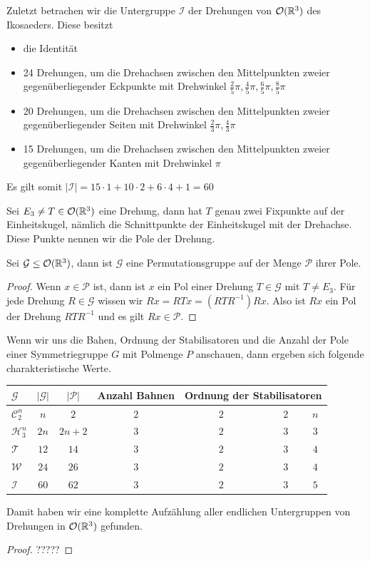 Zuletzt betrachen wir die Untergruppe $\mathcal{I}$ der Drehungen von ${\mathcal{O}(\mathbb{R}^3)}$ des Ikosaeders. Diese besitzt
\begin{itemize} 
  \item die Identität
  \item 24 Drehungen, um die Drehachsen zwischen den Mittelpunkten zweier gegenüberliegender Eckpunkte mit Drehwinkel $\frac{2}{5}\pi,\frac{4}{5}\pi,\frac{6}{5}\pi,\frac{8}{5}\pi$
  \item 20 Drehungen, um die Drehachsen zwischen den Mittelpunkten zweier gegenüberliegender Seiten mit Drehwinkel $\frac{2}{3}\pi,\frac{4}{3}\pi$
  \item 15 Drehungen, um die Drehachsen zwischen den Mittelpunkten zweier gegenüberliegender Kanten mit Drehwinkel $\pi$
\end{itemize}
Es gilt somit $|\mathcal{I}|=15 \cdot 1 + 10 \cdot 2 + 6 \cdot 4 +1 = 60$
\begin{defi}
 Sei $E_3 \neq T \in {\mathcal{O}(\mathbb{R}^3)}$ eine Drehung, dann hat $T$ genau zwei Fixpunkte auf der Einheitskugel, nämlich die Schnittpunkte der Einheitskugel mit der Drehachse. Diese Punkte nennen wir die Pole der Drehung.
\end{defi}
\begin{lemma}
 Sei $\mathcal{G} \leq {\mathcal{O}(\mathbb{R}^3)}$, dann ist $\mathcal{G}$ eine Permutationsgruppe auf der Menge $\mathcal{P}$ ihrer Pole.
\end{lemma}
\begin{proof}
 Wenn $x \in \mathcal{P}$ ist, dann ist $x$ ein Pol einer Drehung $T \in \mathcal{G}$ mit $T \neq E_3$. Für jede Drehung $R \in \mathcal{G}$ wissen wir $Rx=RTx=(RTR^{-1})Rx$. Also ist $Rx$ ein Pol der Drehung $RTR^{-1}$ und es gilt $Rx \in \mathcal{P}$.
\end{proof}
\begin{bem}
 Wenn wir uns die Bahen, Ordnung der Stabilisatoren und die Anzahl der Pole einer Symmetriegruppe $G$ mit Polmenge $P$ anschauen, dann ergeben sich folgende charakteristische Werte. \\
 {%
\begin{center}
\begin{tabular}{l|cccccc}
$\mathcal{G}$ & $|\mathcal{G}|$ & $|\mathcal{P}|$ & Anzahl Bahnen & \multicolumn{3}{c}{Ordnung der Stabilisatoren}\\
\hline
$\mathcal{C}^n_2$ & $n$ & $2$ & $2$ & \ \ \ \ \ $2$ & \ \ \ \ \ \ $2$ & $n$\\
$\mathcal{H}^n_3$ & $2n$ & $2n + 2$ & $3$ & \ \ \ \ \ $2$ & \ \ \ \ \ \ $3$ & $3$\\
$\mathcal{T}$ & $12$ & $14$ & $3$ & \ \ \ \ \ $2$ & \ \ \ \ \ \ $3$ & $4$\\
$\mathcal{W}$ & $24$ & $26$ & $3$ & \ \ \ \ \  $2$ & \ \ \ \ \ \ $3$ & $4$\\
$\mathcal{I}$ & $60$ & $62$ & $3$ & \ \ \ \ \ $2$ & \ \ \ \ \ \ $3$ & $5$
 \end{tabular}
 \end{center}
}%
Damit haben wir eine komplette Aufzählung aller endlichen Untergruppen von Drehungen in ${\mathcal{O}(\mathbb{R}^3)}$ gefunden.
\end{bem}
\begin{proof}
 ?????
\end{proof}



